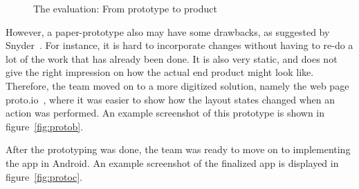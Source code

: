 \begin{figure}[H]
  \centering
\quad
\quad
\caption{The evaluation: From prototype to product}
\end{figure}


\noindent However, a paper-prototype also may have some drawbacks, as suggested by Snyder~\cite{paperprototype}. For instance, it is hard to incorporate changes without having to re-do a lot of the work that has already been done. It is also very static, and does not give the right impression on how the actual end product might look like. Therefore, the team moved on to a more digitized solution, namely the web page proto.io~\cite{protoio}, where it was easier to show how the layout states changed when an action was performed. An example screenshot of this prototype is shown in figure~\ref{fig:protob}.

After the prototyping was done, the team was ready to move on to implementing the app in Android. An example screenshot of the finalized app is displayed in figure~\ref{fig:protoc}.

